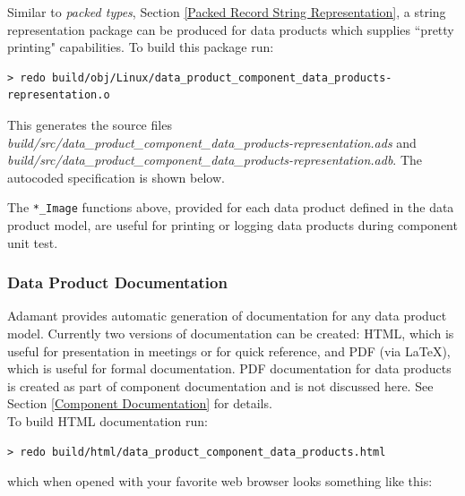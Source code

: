 Similar to \textit{packed types}, Section \ref{Packed Record String Representation}, a string representation package can be produced for data products which supplies ``pretty printing" capabilities. To build this package run:

\vspace{5mm} %
\begin{verbatim}
> redo build/obj/Linux/data_product_component_data_products-representation.o
\end{verbatim}
\vspace{5mm} %

This generates the source files \textit{build/src/data\_product\_component\_data\_products-representation.ads} and \textit{build/src/data\_product\_component\_data\_products-representation.adb}. The autocoded specification is shown below.


The \texttt{*\_Image} functions above, provided for each data product defined in the data product model, are useful for printing or logging data products during component unit test.

\subsubsection{Data Product Documentation}

Adamant provides automatic generation of documentation for any data product model. Currently two versions of documentation can be created: HTML, which is useful for presentation in meetings or for quick reference, and PDF (via \LaTeX), which is useful for formal documentation. PDF documentation for data products is created as part of component documentation and is not discussed here. See Section \ref{Component Documentation} for details. \\

To build HTML documentation run:

\vspace{5mm} %
\begin{verbatim}
> redo build/html/data_product_component_data_products.html
\end{verbatim}
\vspace{5mm} %

which when opened with your favorite web browser looks something like this: \\

